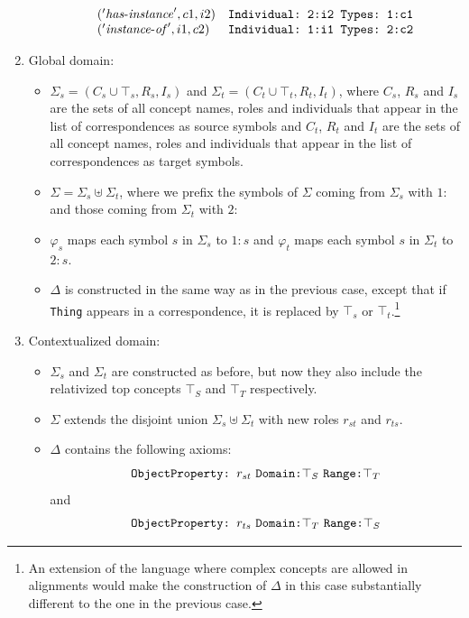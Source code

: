 \documentclass[10pt, a4paper]{isov2}
\begin{document}
\begin{enumerate}
\begin{itemize}
$$\begin{array}{ll}
            ('\mathit{has\text{-}instance}', c1, i2) & \verb+Individual: 2:i2 Types: 1:c1+\\
            ('\mathit{instance\text{-}of}', i1, c2) & \verb+Individual: 1:i1 Types: 2:c2+
          \end{array}$$         
 \end{itemize}
\item Global domain: 
  \begin{itemize}
   \item 
         $\Sigma_s = (C_s\cup{\top_s}, R_s, I_s)$ and $\Sigma_t = (C_t\cup{\top_t}, R_t,I_t)$,
         where $C_s$, $R_s$ and $I_s$ are the sets of all concept names, roles
         and individuals that appear in the list of correspondences as source symbols
         and $C_t$, $R_t$ and $I_t$ are the sets of all concept names, roles
         and individuals that appear in the list of correspondences as target symbols.
  \item $\Sigma = \Sigma_s \uplus \Sigma_t$, where we prefix the symbols of 
        $\Sigma$ coming from $\Sigma_s$ with $1:$ and those coming from
        $\Sigma_t$ with $2:$
  \item $\varphi_s$ maps each symbol $s$ in $\Sigma_s$ to $1:s$
        and $\varphi_t$ maps each symbol $s$ in $\Sigma_t$ to $2:s$.
  \item $\Delta$ is constructed in the same way as in the previous case, except
        that if \verb+Thing+ appears in a correspondence, it is replaced by
        $\top_s$ or $\top_t$.\footnote{An extension of the language where complex concepts are allowed in alignments would make the construction of $\Delta$ in this
        case substantially different to the one in the previous case.} 
  \end{itemize}
        \item Contextualized domain:
 \begin{itemize}
   \item $\Sigma_s$ and $\Sigma_t$ are constructed as before, but now they also
         include the relativized top concepts $\top_S$ and $\top_T$ respectively.
   \item $\Sigma$ extends the disjoint union $\Sigma_s \uplus \Sigma_t$ with 
         new roles $r_{st}$ and $r_{ts}$.
   \item $\Delta$ contains the following axioms: 
          $$ \verb+ObjectProperty: + r_{st}~ \verb+Domain:+ \top_S~ \verb+Range:+ \top_T$$
          and 
          $$ \verb+ObjectProperty: + r_{ts}~ \verb+Domain:+ \top_T~ \verb+Range:+ \top_S$$

\end{itemize}
\end{enumerate}
\end{document}
